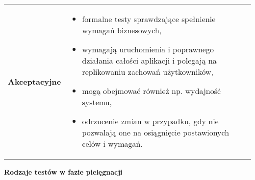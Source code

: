 \documentclass[../main.tex]{subfiles}
\begin{document}
\begin{table}[H]
\begin{center}
\begin{tabular}{ p{5cm} p{11cm} }
                \toprule

                \textbf{Akceptacyjne}
                &
                \begin{itemize}
                    \item formalne testy sprawdzające spełnienie wymagań biznesowych,
                    \item wymagają uruchomienia i
                    poprawnego działania całości aplikacji i polegają na replikowaniu zachowań użytkowników,
                    \item mogą obejmować również np. wydajność systemu,
                    \item odrzucenie zmian w przypadku, gdy nie pozwalają one na
                    osiągnięcie postawionych celów i wymagań.
                \end{itemize}
                \\
            \end{tabular}
        \end{center}
    \end{table}

    \textbf{Rodzaje testów w fazie pielęgnacji}
\end{document}
